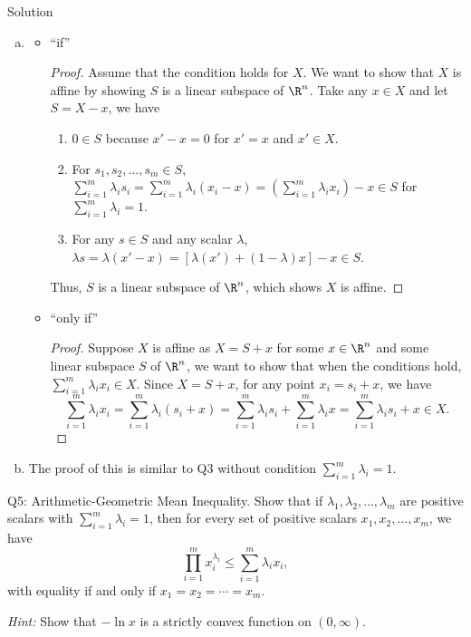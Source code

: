 \documentclass{article}
\theoremstyle{plain}
\theoremstyle{definition}
\theoremstyle{remark}
\begin{document}
\begin{solution}
    {Solution}
    \begin{enumerate}[(a)]
        \item {
            \begin{itemize}
                \item ``if'' {
                    \begin{proof}
                        Assume that the condition holds for $X$. We want to show that $X$ is affine by showing $S$ is a linear subspace of $\R^n$. Take any $x\in X$ and let $S=X-x$, we have
                        \begin{enumerate}[(1)]
                            \item $0\in S$ because $x'-x=0$ for $x'=x$ and $x'\in X$.
                            \item For $s_1, s_2,\ldots,s_m\in S$, $\sum_{i=1}^{m}\lambda_i s_i=\sum_{i=1}^{m}\lambda_i(x_i-x)=(\sum_{i=1}^{m}\lambda_i x_i)-x\in S$ for $\sum_{i=1}^{m}\lambda_i=1$.
                            \item For any $s\in S$ and any scalar $\lambda$, $\lambda s=\lambda(x'-x)=[\lambda(x')+(1-\lambda)x]-x\in S$.
                        \end{enumerate}
                        Thus, $S$ is a linear subspace of $\R^n$, which shows $X$ is affine.
                    \end{proof}
                }
                \item ``only if'' {
                    \begin{proof}
                        Suppose $X$ is affine as $X=S+x$ for some $x\in\R^n$ and some linear subspace $S$ of $\R^n$, we want to show that when the conditions hold, $\sum_{i=1}^{m}\lambda_i x_i\in X$. Since $X=S+x$, for any point $x_i=s_i+x$, we have
                        \[
                            \sum_{i=1}^{m}\lambda_i x_i=\sum_{i=1}^{m}\lambda_i(s_i+x)=\sum_{i=1}^{m}\lambda_i s_i+\sum_{i=1}^{m}\lambda_i x=\sum_{i=1}^{m}\lambda_i s_i+x\in X.
                        \]
                    \end{proof}
                }
            \end{itemize}
        }
        \item The proof of this is similar to Q3 without condition $\sum_{i=1}^{m}\lambda_i=1$.
    \end{enumerate}
\end{solution}

\begin{problem}
    {Q5: Arithmetic-Geometric Mean Inequality.}
    Show that if $\lambda_1, \lambda_2, \ldots, \lambda_m$ are positive scalars with $\sum_{i=1}^{m}\lambda_i=1$, then for every set of positive scalars $x_1, x_2, \ldots, x_m$, we have
    \[
        \prod_{i=1}^{m}x_i^{\lambda_i}\leq\sum_{i=1}^{m}\lambda_ix_i,
    \]
    with equality if and only if $x_1=x_2=\cdots=x_m$.

    \textit{Hint:} Show that $-\ln x$ is a strictly convex function on $(0,\infty)$.
\end{problem}
\end{document}
